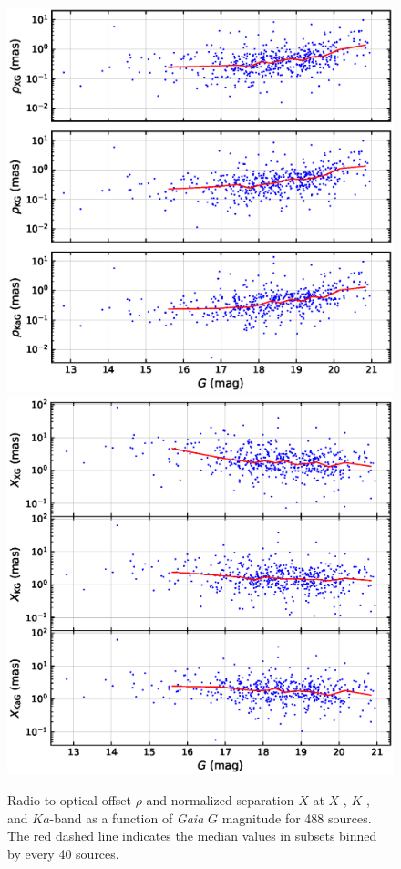 \documentclass{aa}
\begin{document}
    \begin{figure}[hbtp]
        \centering
        \includegraphics[width=0.6\columnwidth]{figs/rho-g-mag}
        \includegraphics[width=0.6\columnwidth]{figs/X-g-mag}
        \caption[]{\label{fig:rho-g-mag}
            Radio-to-optical offset $\rho$ and normalized separation $X$ at $X$-, $K$-, and $Ka$-band as a function of \textit{Gaia} $G$ magnitude for 488 sources.
            The red dashed line indicates the median values in subsets binned by every 40 sources.
        }
    \end{figure}
\end{document}
